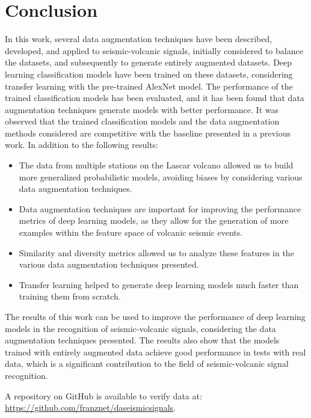 \documentclass[journal]{IEEEtran}
\begin{document}
\section{Conclusion} \label{conclusion}
In this work, several data augmentation techniques have been described, developed, and applied to seismic-volcanic signals, initially considered to balance the datasets, and subsequently to generate entirely augmented datasets. Deep learning classification models have been trained on these datasets, considering transfer learning with the pre-trained AlexNet model.
The performance of the trained classification models has been evaluated, and it has been found that data augmentation techniques generate models with better performance.
It was observed that the trained classification models and the data augmentation methods considered are competitive with the baseline presented in a previous work. In addition to the following results:
\begin{itemize}
 \item The data from multiple stations on the Lascar volcano allowed us to build more generalized probabilistic models, avoiding biases by considering various data augmentation techniques.
 \item Data augmentation techniques are important for improving the performance metrics of deep learning models, as they allow for the generation of more examples within the feature space of volcanic seismic events.
 \item Similarity and diversity metrics allowed us to analyze these features in the various data augmentation techniques presented.
 \item Transfer learning helped to generate deep learning models much faster than training them from scratch.
\end{itemize}
The results of this work can be used to improve the performance of deep learning models in the recognition of seismic-volcanic signals, considering the data augmentation techniques presented. The results also show that the models trained with entirely augmented data achieve good performance in tests with real data, which is a significant contribution to the field of seismic-volcanic signal recognition.

A repository on GitHub is available to verify data at: \href{https://github.com/franznet/daseismicsignals}{\color{blue}https://github.com/franznet/daseismicsignals}.


\end{document}
